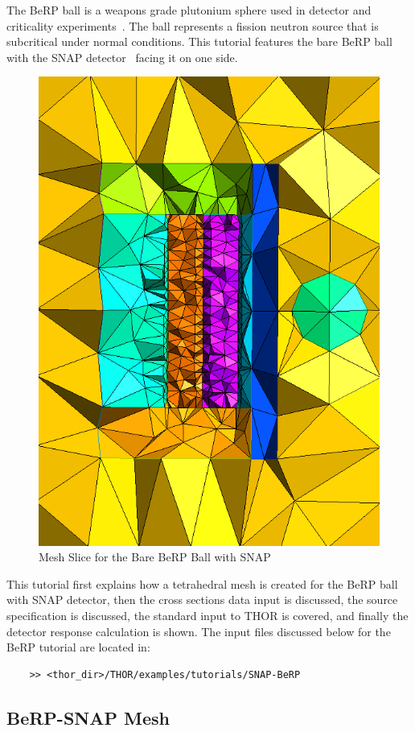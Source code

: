 The BeRP ball is a weapons grade plutonium sphere used in detector and criticality experiments~\cite{BeRP_report}.
The ball represents a fission neutron source that is subcritical under normal conditions.
This tutorial features the bare BeRP ball with the SNAP detector~\cite{snapdetector} facing it on one side.

\begin{figure}[th]
  \includegraphics[height=1.0\textwidth, angle=90]{chapters/tutorials/figures/berp_snap_mesh.png}
  \caption{Mesh Slice for the Bare BeRP Ball with SNAP}
  \label{fig:berp_snap_mesh}
\end{figure}

This tutorial first explains how a tetrahedral mesh is created for the BeRP ball with SNAP detector, then the cross sections data input is discussed, the source specification is discussed, the standard input to THOR is covered, and finally the detector response calculation is shown.
The input files discussed below for the BeRP tutorial are located in:
\begin{verbatim}
    >> <thor_dir>/THOR/examples/tutorials/SNAP-BeRP
\end{verbatim}

\subsection{BeRP-SNAP Mesh}\label{ch:tuts:sec:berpsnap:ssec:mesh}

